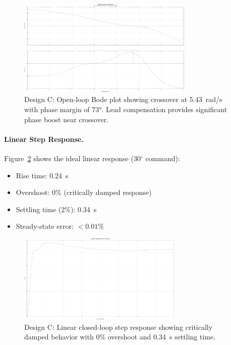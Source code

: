 \begin{figure}[h!]
\centering
\includegraphics[width=0.75\textwidth]{../MATLAB/LaTeX_Exports/design_C_bode.pdf}
\caption{Design C: Open-loop Bode plot showing crossover at 5.43~rad/s with phase margin of 73°. Lead compensation provides significant phase boost near crossover.}
\label{fig:design_C_bode}
\end{figure}

\paragraph{Linear Step Response.}
Figure~\ref{fig:design_C_step} shows the ideal linear response (30$^\circ$ command):
\begin{itemize}
    \item Rise time: 0.24~s
    \item Overshoot: 0\% (critically damped response)
    \item Settling time (2\%): 0.34~s
    \item Steady-state error: $<0.01\%$
\end{itemize}

\begin{figure}[h!]
\centering
\includegraphics[width=0.7\textwidth]{../MATLAB/LaTeX_Exports/design_C_step.pdf}
\caption{Design C: Linear closed-loop step response showing critically damped behavior with 0\% overshoot and 0.34~s settling time.}
\label{fig:design_C_step}
\end{figure}

